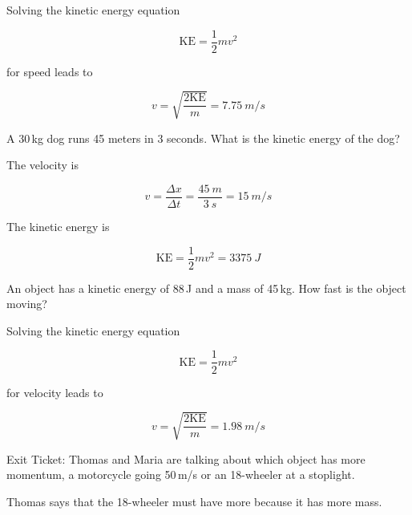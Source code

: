 \documentclass[../main-physics-problems.tex]{subfiles}
\begin{document}
\begin{questions}
\begin{solution}
Solving the kinetic energy equation

\begin{equation*}
    \mathrm{KE} = \frac{1}{2} mv^2
\end{equation*}

for speed leads to

\begin{equation*}
    v = \sqrt{\frac{2\mathrm{KE}}{m}} = \boxed{\SI{7.75}{m/s}}
\end{equation*}
\end{solution}

\question %
A 30\,kg dog runs 45 meters in 3 seconds. What is the kinetic energy of the dog?

\begin{solution}
The velocity is

\begin{equation*}
    v = \frac{\Delta x}{\Delta t} = \frac{\SI{45}{m}}{\SI{3}{s}} = \SI{15}{m/s}
\end{equation*}

The kinetic energy is

\begin{equation*}
    \mathrm{KE} = \frac{1}{2} m v^2 = \boxed{\SI{3375}{J}}
\end{equation*}
\end{solution}




\question %
An object has a kinetic energy of 88\,J and a mass of 45\,kg. How fast is the object moving?

\begin{solution}
Solving the kinetic energy equation 

\begin{equation*}
    \mathrm{KE} = \frac{1}{2}mv^2
\end{equation*}

for velocity leads to

\begin{equation*}
    v = \sqrt{\frac{2\mathrm{KE}}{m}} = \boxed{\SI{1.98}{m/s}}
\end{equation*}
\end{solution}
 
\question %
Exit Ticket: Thomas and Maria are talking about which object has more momentum, a motorcycle going 50\,m/s or an 18-wheeler at a stoplight. 

Thomas says that the 18-wheeler must have more because it has more mass. 


\end{questions}
\end{document}
